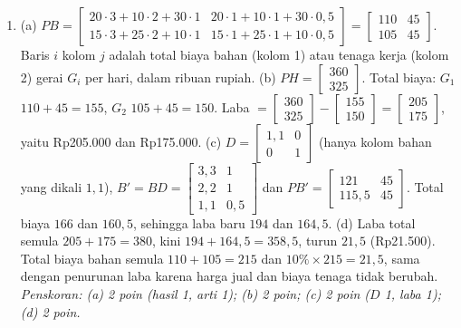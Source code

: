 \documentclass[a4paper,11pt]{article}
\begin{document}
\small\begin{enumerate}[leftmargin=2em,itemsep=3pt,topsep=2pt]
\item[\textbf{1.}] (a) $PB=\begin{bmatrix}20\cdot3+10\cdot2+30\cdot1&20\cdot1+10\cdot1+30\cdot0{,}5\\15\cdot3+25\cdot2+10\cdot1&15\cdot1+25\cdot1+10\cdot0{,}5\end{bmatrix}=\begin{bmatrix}110&45\\105&45\end{bmatrix}$. Baris $i$ kolom $j$ adalah total biaya bahan (kolom 1) atau tenaga kerja (kolom 2) gerai $G_i$ per hari, dalam ribuan rupiah. (b) $PH=\begin{bmatrix}360\\325\end{bmatrix}$. Total biaya: $G_1$ $110+45=155$, $G_2$ $105+45=150$. Laba $=\begin{bmatrix}360\\325\end{bmatrix}-\begin{bmatrix}155\\150\end{bmatrix}=\begin{bmatrix}205\\175\end{bmatrix}$, yaitu Rp205.000 dan Rp175.000. (c) $D=\begin{bmatrix}1{,}1&0\\0&1\end{bmatrix}$ (hanya kolom bahan yang dikali $1{,}1$), $B'=BD=\begin{bmatrix}3{,}3&1\\2{,}2&1\\1{,}1&0{,}5\end{bmatrix}$ dan $PB'=\begin{bmatrix}121&45\\115{,}5&45\end{bmatrix}$. Total biaya $166$ dan $160{,}5$, sehingga laba baru $194$ dan $164{,}5$. (d) Laba total semula $205+175=380$, kini $194+164{,}5=358{,}5$, turun $21{,}5$ (Rp21.500). Total biaya bahan semula $110+105=215$ dan $10\%\times215=21{,}5$, sama dengan penurunan laba karena harga jual dan biaya tenaga tidak berubah. \\ \textit{Penskoran: (a) 2 poin (hasil 1, arti 1); (b) 2 poin; (c) 2 poin ($D$ 1, laba 1); (d) 2 poin.}

\end{enumerate}
\end{document}
